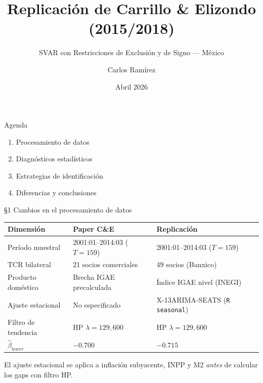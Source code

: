 \documentclass[aspectratio=169,10pt]{beamer}
\title{Replicaci\'on de Carrillo \& Elizondo (2015/2018)}
\subtitle{SVAR con Restricciones de Exclusi\'on y de Signo --- M\'exico}
\author{Carlos Ramírez}
\institute{ITAM}
\date{Abril 2026}
\begin{document}
\maketitle

\begin{frame}{Agenda}
\begin{enumerate}
  \item Procesamiento de datos
  \item Diagn\'osticos estad\'isticos
  \item Estrategias de identificaci\'on
  \item Diferencias y conclusiones
\end{enumerate}
\end{frame}


\begin{frame}{\S1 Cambios en el procesamiento de datos}
\begin{center}
\small
\begin{tabular}{lll}
  \toprule
  \textbf{Dimensi\'on} & \textbf{Paper C\&E} & \textbf{Replicaci\'on} \\
  \midrule
  Per\'iodo muestral    & 2001:01--2014:03 ($T=159$)     & 2001:01--2014:03 ($T=159$)            \\
  TCR bilateral         & 21 socios comerciales           & 49 socios (Banxico)                   \\
  Producto dom\'estico  & Brecha IGAE precalculada        & \'Indice IGAE nivel (INEGI)           \\
  Ajuste estacional     & No especificado                 & X-13ARIMA-SEATS (\texttt{R seasonal}) \\
  Filtro de tendencia   & HP $\lambda=129{,}600$          & HP $\lambda=129{,}600$                \\
  $\hat{\beta}_{lower}$ & $-0.700$                        & $-0.715$                              \\
  \bottomrule
\end{tabular}
\end{center}
\vspace{0.2cm}
\small
El ajuste estacional se aplica a inflaci\'on subyacente, INPP y M2
\emph{antes} de calcular los gaps con filtro HP.
\end{frame}
\end{document}
